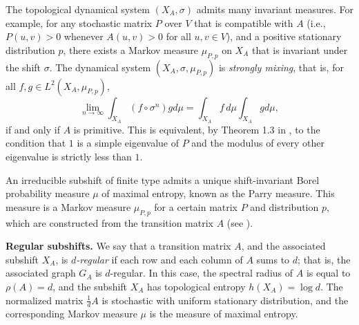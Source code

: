 \documentclass[12pt]{article}
\theoremstyle{definition}
\begin{document}
The topological dynamical system $(X_A,\sigma)$ admits many invariant measures. For example, for any stochastic matrix $P$ over $V$ that is compatible with $A$ (i.e., $P(u,v)>0$ whenever $A(u,v)>0$ for all $u,v\in V$), and a positive stationary distribution $p$, there exists a Markov measure $\mu_{P,p}$ on $X_A$ that is invariant under the shift $\sigma$. The dynamical system $(X_A,\sigma,\mu_{P,p})$ is \textit{strongly mixing}, that is,
for all $f,g \in L^2(X_A,\mu_{P,p})$,
\[
\lim_{n \to \infty} \int_{X_A} (f\circ \sigma^n) g d\mu
=\int_{X_A} f\, d\mu \int_{X_A} g d\mu,
\]
if and only if $A$ is primitive. This is equivalent, by Theorem 1.3 in \cite{Baladi}, to the condition that $1$ is a simple eigenvalue of $P$ and the modulus of every other eigenvalue is strictly less than $1$.

An irreducible subshift of finite type admits a unique shift-invariant Borel probability measure $\mu$ of maximal entropy, known as the Parry measure. This measure is a Markov measure $\mu_{P,p}$ for a certain matrix $P$ and distribution $p$, which are constructed from the transition matrix $A$ (see \cite[Example 2, page 15]{Baladi}). %




\vspace{0.2cm}
\textbf{Regular subshifts.}
We say that a transition matrix $A$, and the associated subshift $X_A$, is \textit{$d$-regular} if each row and each column of $A$ sums to $d$; that is, the associated graph $G_A$ is $d$-regular. In this case, the spectral radius of $A$ is equal to $\rho(A)=d$, and the subshift $X_A$ has topological entropy $h(X_A)=\log d$. The normalized matrix $\tfrac{1}{d}A$ is stochastic with uniform stationary distribution, and the corresponding Markov measure $\mu$ is the measure of maximal entropy.
\end{document}
